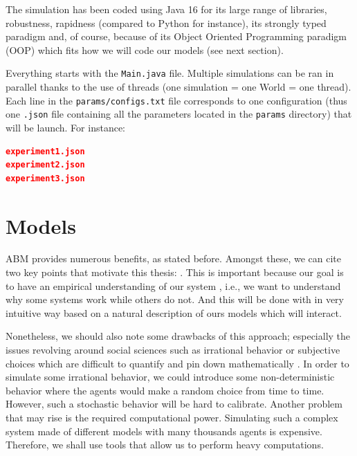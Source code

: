     The simulation has been coded using Java 16 for its large range of libraries, robustness, rapidness (compared to Python for instance), its strongly typed paradigm and, of course, because of its Object Oriented Programming paradigm (OOP) which fits how we will code our models (see next section). 

    Everything starts with the \texttt{Main.java} file. Multiple simulations can be ran in parallel thanks to the use of threads (one simulation = one World = one thread). Each line in the \texttt{params/configs.txt} file corresponds to one configuration (thus one \texttt{.json} file containing all the parameters located in the \texttt{params} directory) that will be launch. For instance:

    \begin{lstlisting}[language=json,firstnumber=1]
experiment1.json
experiment2.json
experiment3.json
    \end{lstlisting}



\section{Models}\label{section:models}

ABM provides numerous benefits, as stated before. Amongst these, we can cite two key points that motivate this thesis: . This is important because our goal is to have an empirical understanding of our system \cite{tesfatsion_handbook}, i.e., we want to understand why some systems work while others do not. And this will be done with in very intuitive way based on a natural description of ours models which will interact.

Nonetheless, we should also note some drawbacks of this approach; especially the issues revolving around social sciences such as irrational behavior or subjective choices which are difficult to quantify and pin down mathematically \cite{ABM}. In order to simulate some irrational behavior, we could introduce some non-deterministic behavior where the agents would make a random choice from time to time. However, such a stochastic behavior will be hard to calibrate. 
Another problem that may rise is the required computational power. Simulating such a complex system made of different models with many thousands agents is expensive. Therefore, we shall use tools that allow us to perform heavy computations. 

